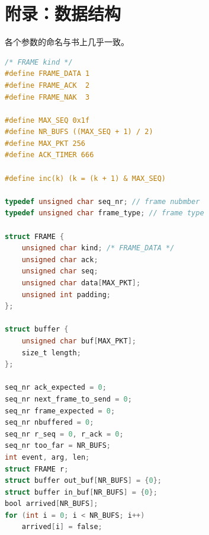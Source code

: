 \documentclass[14pt]{article} %
\begin{document}
\section{附录：数据结构}
各个参数的命名与书上几乎一致。
\begin{lstlisting}[language=C]
/* FRAME kind */
#define FRAME_DATA 1
#define FRAME_ACK  2
#define FRAME_NAK  3

#define MAX_SEQ 0x1f
#define NR_BUFS ((MAX_SEQ + 1) / 2)
#define MAX_PKT 256
#define ACK_TIMER 666

#define inc(k) (k = (k + 1) & MAX_SEQ)

typedef unsigned char seq_nr; // frame nubmber
typedef unsigned char frame_type; // frame type

struct FRAME {
	unsigned char kind; /* FRAME_DATA */
	unsigned char ack;
	unsigned char seq;
	unsigned char data[MAX_PKT];
	unsigned int padding;
};

struct buffer {
	unsigned char buf[MAX_PKT];
	size_t length;
};

seq_nr ack_expected = 0;
seq_nr next_frame_to_send = 0;
seq_nr frame_expected = 0;
seq_nr nbuffered = 0;
seq_nr r_seq = 0, r_ack = 0;
seq_nr too_far = NR_BUFS;
int event, arg, len;
struct FRAME r;
struct buffer out_buf[NR_BUFS] = {0};
struct buffer in_buf[NR_BUFS] = {0};
bool arrived[NR_BUFS];
for (int i = 0; i < NR_BUFS; i++)
	arrived[i] = false;
\end{lstlisting}
\end{document}
